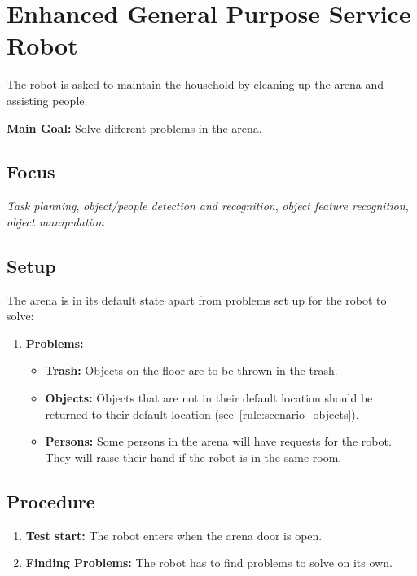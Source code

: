 \section{Enhanced General Purpose Service Robot}\label{test:egpsr}
The robot is asked to maintain the household by cleaning up the arena and assisting people.


\noindent \textbf{Main Goal:} Solve different problems in the arena.\\


\subsection*{Focus}
\emph{Task planning}, \emph{object/people detection and recognition}, \emph{object feature recognition}, \emph{object manipulation}


\subsection*{Setup}
The arena is in its default state apart from problems set up for the robot to solve:
\begin{enumerate}
    \item \textbf{Problems:}
		\begin{itemize}
			\item \textbf{Trash:} Objects on the floor are to be thrown in the trash.
			\item \textbf{Objects:} Objects that are not in their default location should be returned to their default location (see~\ref{rule:scenario_objects}). 
			\item \textbf{Persons:} Some persons in the arena will have requests for the robot. They will raise their hand if the robot is in the same room.
		\end{itemize}
\end{enumerate}


\subsection*{Procedure}
\begin{enumerate}[nosep]
	\item \textbf{Test start:} The robot enters when the arena door is open.
	\item \textbf{Finding Problems:} The robot has to find problems to solve on its own.
\end{enumerate}


